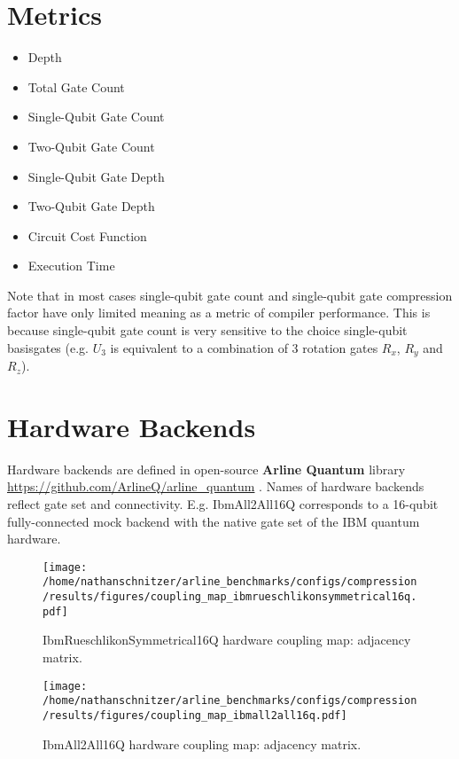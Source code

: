 \documentclass{report}%
\begin{document}
\section{Metrics}%
\label{sec:Metrics}%
\begin{itemize}%
\item%
Depth%
\item%
Total Gate Count%
\item%
Single-Qubit Gate Count%
\item%
Two-Qubit Gate Count%
\item%
Single-Qubit Gate Depth%
\item%
Two-Qubit Gate Depth%
\item%
Circuit Cost Function%
\item%
Execution Time%
\end{itemize}%
Note that in most cases single-qubit gate count and single-qubit gate compression factor
                    have only limited meaning as a metric of compiler performance. This is because single-qubit
                    gate count is very sensitive to the choice single-qubit basisgates (e.g. $U_3$ is equivalent
                    to a combination of 3 rotation gates $R_x$, $R_y$ and $R_z$).

%
\section{Hardware Backends }%
\label{sec:HardwareBackends}%
Hardware backends are defined in open-source \textbf{Arline Quantum} library %
\linebreak%
\hyperref[]{https://github.com/ArlineQ/arline\_quantum}%
. Names of hardware backends reflect gate set and connectivity. E.g. IbmAll2All16Q
                    corresponds to a 16-qubit fully-connected mock backend with the native gate set of the IBM
                    quantum hardware. \bigskip%


\begin{figure}[h!]%
\centering%
\texttt{[image: /home/nathanschnitzer/arline\_benchmarks/configs/compression/results/figures/coupling\_map\_ibmrueschlikonsymmetrical16q.pdf]}%
\caption{IbmRueschlikonSymmetrical16Q hardware coupling map: adjacency matrix.}%
\end{figure}

%


\begin{figure}[h!]%
\centering%
\texttt{[image: /home/nathanschnitzer/arline\_benchmarks/configs/compression/results/figures/coupling\_map\_ibmall2all16q.pdf]}%
\caption{IbmAll2All16Q hardware coupling map: adjacency matrix.}%
\end{figure}
\end{document}
